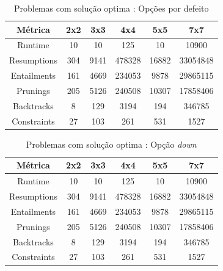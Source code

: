 \documentclass{llncs}
\begin{document}
\setlength{\tabcolsep}{12pt}
\begin{table}[ht] 
\caption{Problemas com solu\c{c}\~{a}o optima : Op\c{c}\~{o}es por defeito} %
\centering %
\begin{tabular}{c c c c c c} %
\hline\hline %

M\'{e}trica & 2x2 & 3x3 & 4x4 & 5x5 & 7x7\\ [0.5ex] %
\hline %
Runtime & 10 & 10 & 125 & 10 & 10900 \\ %
Resumptions & 304 & 9141 & 478328 & 16882 & 33054848 \\ 
Entailments & 161 & 4669 & 234053 & 9878 & 29865115  \\ 
Prunings & 205 & 5126 & 240508 & 10307 & 17858406 \\ 
Backtracks & 8 & 129 & 3194 & 194 & 346785 \\ 
Constraints & 27 & 103 & 261 & 531 & 1527 \\ [1ex] %
\hline %
\end{tabular} 
\label{tabela:1} %
\end{table}


\setlength{\tabcolsep}{12pt}
\begin{table}[ht] 
\caption{Problemas com solu\c{c}\~{a}o optima : Op\c{c}\~{a}o \emph{down}} %
\centering %
\begin{tabular}{c c c c c c} %
\hline\hline %

M\'{e}trica & 2x2 & 3x3 & 4x4 & 5x5 & 7x7\\ [0.5ex] %
\hline %
Runtime & 10 & 10 & 125 & 10 & 10900 \\
Resumptions & 304 & 9141 & 478328 & 16882 & 33054848 \\
Entailments & 161 & 4669 & 234053 & 9878 & 29865115 \\
Prunings & 205 & 5126 & 240508 & 10307 & 17858406 \\
Backtracks & 8 & 129 & 3194 & 194 & 346785 \\
Constraints & 27 & 103 & 261 & 531 & 1527 \\[1 ex]
\hline %
\end{tabular} 
\label{tabela:2} %
\end{table}
\end{document}
